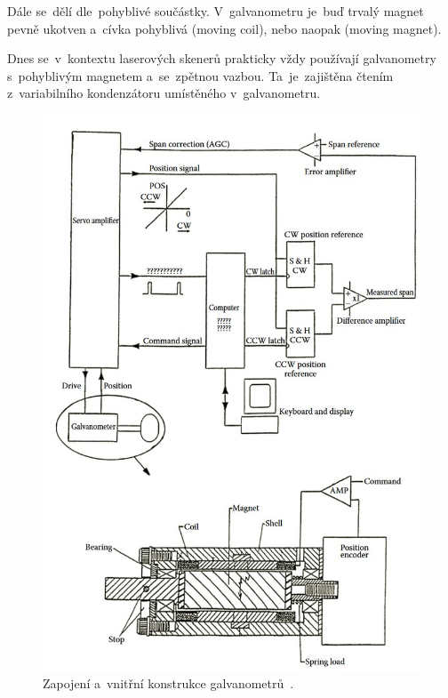 Dále se~dělí dle~pohyblivé součástky. V~galvanometru je~buď trvalý magnet pevně ukotven a~cívka pohyblivá (moving coil), nebo naopak (moving magnet). %

Dnes se~v~kontextu laserových skenerů prakticky vždy používají galvanometry s~pohyblivým magnetem a~se~zpětnou vazbou. Ta~je~zajištěna čtením z~variabilního kondenzátoru umístěného v~galvanometru.

\begin{figure}[htb]
  \centering
  \includegraphics[width=1\textwidth]{img/galvanometer-detail.jpg}
  \caption{\label{fig:galvanometer-detail} Zapojení a~vnitřní konstrukce galvanometrů~\cite{scanning-handbook}.}
\end{figure}
